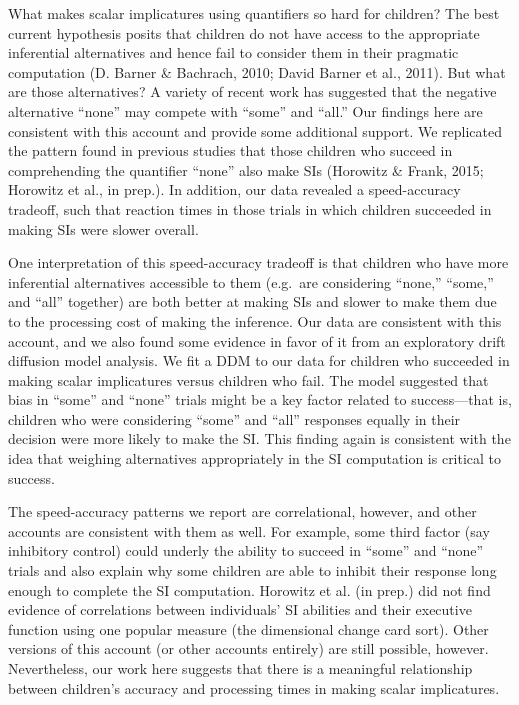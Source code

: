 \documentclass[10pt, letterpaper]{article}
\begin{document}
What makes scalar implicatures using quantifiers so hard for children?
The best current hypothesis posits that children do not have access to
the appropriate inferential alternatives and hence fail to consider them
in their pragmatic computation (D. Barner \& Bachrach, 2010; David
Barner et al., 2011). But what are those alternatives? A variety of
recent work has suggested that the negative alternative ``none'' may
compete with ``some'' and ``all.'' Our findings here are consistent with
this account and provide some additional support. We replicated the
pattern found in previous studies that those children who succeed in
comprehending the quantifier ``none'' also make SIs (Horowitz \& Frank,
2015; Horowitz et al., in prep.). In addition, our data revealed a
speed-accuracy tradeoff, such that reaction times in those trials in
which children succeeded in making SIs were slower overall.

One interpretation of this speed-accuracy tradeoff is that children who
have more inferential alternatives accessible to them (e.g.~are
considering ``none,'' ``some,'' and ``all'' together) are both better at
making SIs and slower to make them due to the processing cost of making
the inference. Our data are consistent with this account, and we also
found some evidence in favor of it from an exploratory drift diffusion
model analysis. We fit a DDM to our data for children who succeeded in
making scalar implicatures versus children who fail. The model suggested
that bias in ``some'' and ``none'' trials might be a key factor related
to success---that is, children who were considering ``some'' and ``all''
responses equally in their decision were more likely to make the SI.
This finding again is consistent with the idea that weighing
alternatives appropriately in the SI computation is critical to success.

The speed-accuracy patterns we report are correlational, however, and
other accounts are consistent with them as well. For example, some third
factor (say inhibitory control) could underly the ability to succeed in
``some'' and ``none'' trials and also explain why some children are able
to inhibit their response long enough to complete the SI computation.
Horowitz et al. (in prep.) did not find evidence of correlations between
individuals' SI abilities and their executive function using one popular
measure (the dimensional change card sort). Other versions of this
account (or other accounts entirely) are still possible, however.
Nevertheless, our work here suggests that there is a meaningful
relationship between children's accuracy and processing times in making
scalar implicatures.
\end{document}
